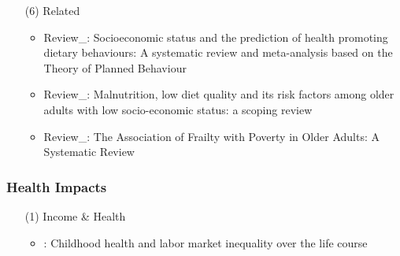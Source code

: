 \documentclass[12pt]{article}
\begin{document}
\begin{itemize}
    \item[(6)] Related
    \begin{itemize}
        \item Review\_\cite{li2019socioeconomic}: Socioeconomic status and the prediction of health promoting dietary behaviours: A systematic review and meta-analysis based on the Theory of Planned Behaviour
        \item Review\_\cite{nazri2021malnutrition}: Malnutrition, low diet quality and its risk factors among older adults with low socio-economic status: a scoping review
        \item Review\_\cite{hayajneh2022association}: The Association of Frailty with Poverty in Older Adults: A Systematic Review
    \end{itemize}   
\end{itemize}



\subsubsection{Health Impacts}
\begin{itemize}
    \item[(1)] Income \& Health
    \begin{itemize}
        \item \cite{haas2011childhood}: Childhood health and labor market inequality over the life course
    \end{itemize}
\end{itemize}
\end{document}

